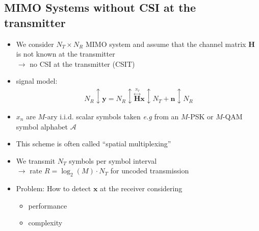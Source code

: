 \documentclass[a4paper, 10pt]{article}
\begin{document}
\subsection{MIMO Systems without CSI at the transmitter}
\begin{itemize}
	\item We consider $N_T\times N_R$ MIMO system and assume that the channel matrix $\mathbf{H}$ is not known at the transmitter\\
	$\rightarrow$ no CSI at the transmitter (CSIT)
	\item signal model:
	\begin{align*}
		N_R \updownarrow\mathbf{y}=N_R \updownarrow \overset{\overset{N_T}{\longleftrightarrow}}{\mathbf{H}}\mathbf{x}\updownarrow N_T+\mathbf{n} \updownarrow N_R
	\end{align*}
	\begin{figure}[h]
		\centering
		
	\end{figure}
	\item $x_n$ are $M$-ary i.i.d. scalar symbols taken \textit{e.g} from an $M$-PSK or $M$-QAM symbol alphabet $\mathscr{A}$
	\item This scheme is often called ``spatial multiplexing''
	\item We transmit $N_T$ symbols per symbol interval\\
	$\rightarrow$ rate $R=\log_2(M)\cdot N_T$ for uncoded transmission
	\item Problem: How to detect $\mathbf{x}$ at the receiver considering
		\begin{itemize}
			\item performance
			\item complexity
		\end{itemize}
\end{itemize}
\end{document}
